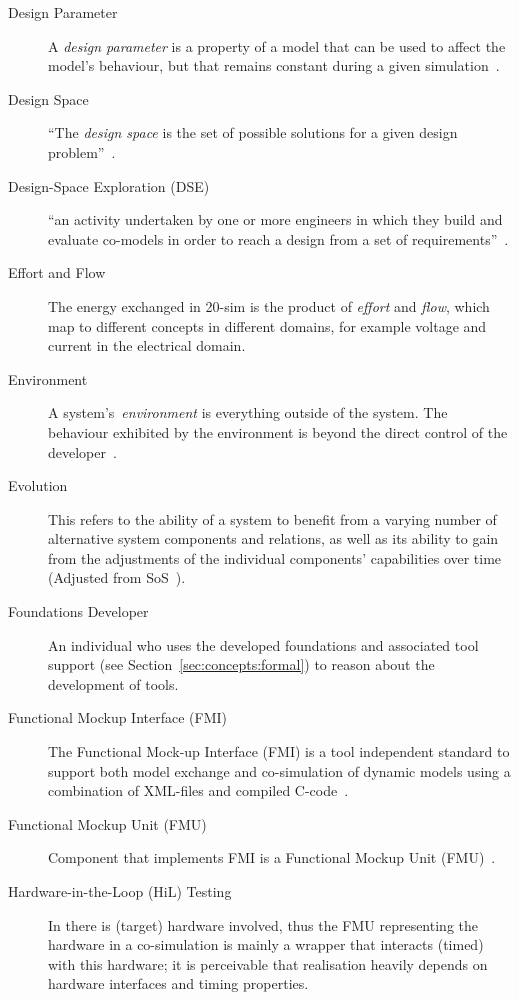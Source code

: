\begin{description}
\item[Design Parameter] A \emph{design parameter} is a property of a model that can be used to affect the model's behaviour, but that remains constant during a given simulation~\cite{Broenink&12b}.

\item[Design Space] ``The \emph{design space} is the set of possible solutions for a given design problem''~\cite{Broenink&12b}.

\item[Design-Space Exploration (DSE)] ``an activity undertaken by one or more engineers in which they build and evaluate co-models in order to reach a design from a set of requirements''~\cite{Broenink&12b}.

\item[Effort and Flow] The energy exchanged in 20-sim is the product of \emph{effort} and \emph{flow}, which map to different concepts in different domains, for example voltage and current in the electrical domain.

\item[Environment] A system's~\emph{environment} is everything outside of the system. The behaviour exhibited by the environment is beyond the direct control of the developer~\cite{Broenink&12b}.

\item[Evolution] This refers to the ability of a system to benefit from a varying number of alternative system components and relations, as well as its ability to gain from the adjustments of the individual components' capabilities over time (Adjusted from SoS~\cite{Nielsen&13}).

\item[Foundations Developer] An individual who uses the developed foundations and associated tool support (see Section~\ref{sec:concepts:formal}) to reason about the development of tools.

\item[Functional Mockup Interface (FMI)] The Functional Mock-up Interface (FMI) is a tool independent standard to support both model exchange and co-simulation of dynamic models using a combination of XML-files and compiled C-code~\cite{FMIStandard2.0}.

\item[Functional Mockup Unit (FMU)] Component that implements FMI is a Functional Mockup Unit (FMU)~\cite{FMIStandard2.0}.

\item[Hardware-in-the-Loop (HiL) Testing] In  there is (target) hardware involved, thus the FMU representing the hardware in a co-simulation is mainly a wrapper that interacts (timed) with this hardware; it is perceivable that realisation heavily depends on hardware interfaces and timing properties.


\end{description}
